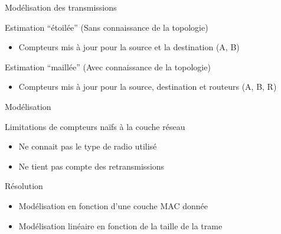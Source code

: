 \begin{frame}{Modélisation des transmissions}
  \begin{figure}
    
  \end{figure}
  \begin{block}{Estimation ``étoilée'' (Sans connaissance de la topologie)}
    \begin{itemize}
      \item Compteurs mis à jour pour la source et la destination (A, B)
    \end{itemize}
  \end{block}
  \begin{block}{Estimation ``maillée'' (Avec connaissance de la topologie)}
    \begin{itemize}
      \item Compteurs mis à jour pour la source, destination et routeurs (A, B, R)
    \end{itemize}
  \end{block}
\end{frame}

\begin{frame}{Modélisation}
  \begin{block}{Limitations de compteurs naïfs à la couche réseau}
    \begin{itemize}
      \item Ne connait pas le type de radio utilisé
      \item Ne tient pas compte des retransmissions
    \end{itemize}
  \end{block}
  \begin{block}{Résolution}
    \begin{itemize}
      \item Modélisation en fonction d'une couche MAC donnée
      \item Modélisation linéaire en fonction de la taille de la trame
    \end{itemize}
  \end{block}
\end{frame}

\DeclarePairedDelimiter{\ceil}{\lceil}{\rceil}

